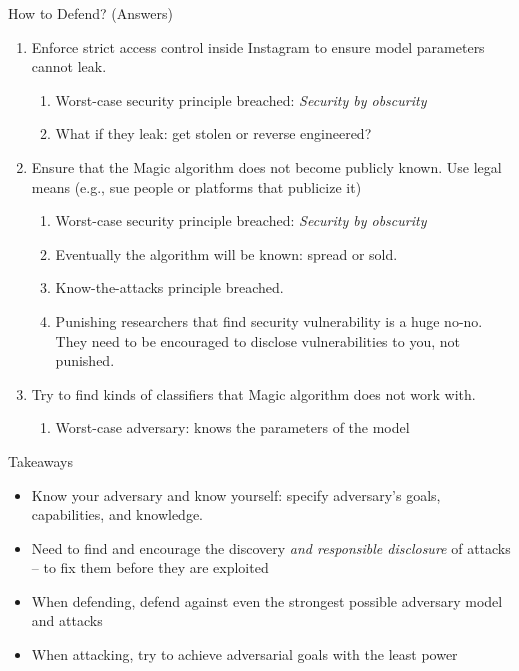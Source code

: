 \documentclass[10pt]{beamer}
\begin{document}
\begin{frame}[fragile]{How to Defend? (Answers)}
  \begin{enumerate}[<+-| alert@+>]
    \item Enforce strict access control inside Instagram to ensure model parameters cannot leak.
      \begin{enumerate}
        \item Worst-case security principle breached: \emph{Security by obscurity}
        \item What if they leak: get stolen or reverse engineered?
      \end{enumerate}
    \item Ensure that the \textsf{Magic} algorithm does not become publicly known. Use legal
      means (e.g., sue people or platforms that publicize it)
      \begin{enumerate}
        \item Worst-case security principle breached: \emph{Security by obscurity}
        \item Eventually the algorithm will be known: spread or sold.
        \item Know-the-attacks principle breached.
        \item Punishing researchers that find security vulnerability is a huge no-no.
          They need to be encouraged to disclose vulnerabilities to you, not punished.
      \end{enumerate}
    \item Try to find kinds of classifiers that \textsf{Magic} algorithm does not work with.
      \begin{enumerate}
        \item Worst-case adversary: knows the parameters of the model
      \end{enumerate}
  \end{enumerate}
\end{frame}


\begin{frame}[fragile]{Takeaways}
  \begin{itemize}[<+->]
    \item Know your adversary and know yourself: specify adversary's goals, capabilities, and
      knowledge.
    \item Need to find and encourage the discovery \emph{and responsible disclosure} of attacks --
      to fix them before they are exploited
    \item When defending, defend against even the strongest possible adversary model and attacks
    \item When attacking, try to achieve adversarial goals with the least power
  \end{itemize}
\end{frame}
\end{document}
